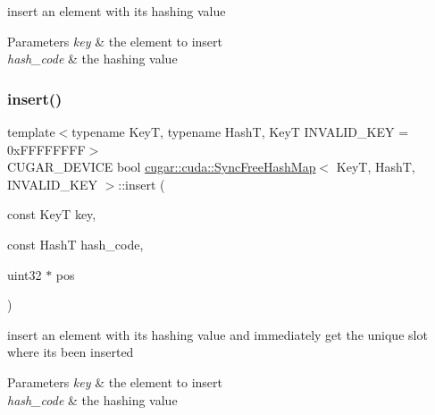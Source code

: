 insert an element with its hashing value


\begin{DoxyParams}{Parameters}
{\em key} & the element to insert \\
\hline
{\em hash\+\_\+code} & the hashing value \\
\hline
\end{DoxyParams}
\mbox{\label{structcugar_1_1cuda_1_1_sync_free_hash_map_a847457f92899ca5af002b7f320b6173f}} 
\subsubsection{\texorpdfstring{insert()}{insert()}\hspace{0.1cm}{\footnotesize\ttfamily [2/2]}}
{\footnotesize\ttfamily template$<$typename KeyT, typename HashT, KeyT I\+N\+V\+A\+L\+I\+D\+\_\+\+K\+EY = 0x\+F\+F\+F\+F\+F\+F\+FF$>$ \\
C\+U\+G\+A\+R\+\_\+\+D\+E\+V\+I\+CE bool \hyperlink{structcugar_1_1cuda_1_1_sync_free_hash_map}{cugar\+::cuda\+::\+Sync\+Free\+Hash\+Map}$<$ KeyT, HashT, I\+N\+V\+A\+L\+I\+D\+\_\+\+K\+EY $>$\+::insert (\begin{DoxyParamCaption}\item[{const KeyT}]{key,  }\item[{const HashT}]{hash\+\_\+code,  }\item[{uint32 $\ast$}]{pos }\end{DoxyParamCaption})\hspace{0.3cm}{\ttfamily [inline]}}

insert an element with its hashing value and immediately get the unique slot where it\textquotesingle{}s been inserted


\begin{DoxyParams}{Parameters}
{\em key} & the element to insert \\
\hline
{\em hash\+\_\+code} & the hashing value \\
\hline
\end{DoxyParams}
\mbox{\label{structcugar_1_1cuda_1_1_sync_free_hash_map_a9d8de7a5b7d5fafc634866a12def9eae}} 
